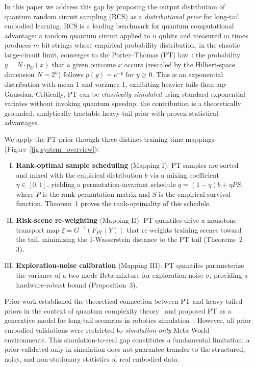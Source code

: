 \documentclass[10pt]{article}
\begin{document}
In this paper we address this gap by proposing the output distribution of quantum random
circuit sampling (RCS) as a \emph{distributional prior} for long-tail embodied learning.
RCS is a leading benchmark for quantum computational advantage: a random quantum circuit
applied to $n$ qubits and measured $m$ times produces $m$ bit strings whose empirical
probability distribution, in the chaotic large-circuit limit, converges to the
Porter--Thomas (PT) law~\citep{porter1956statistical,fischer1982randomness}:
the probability $y=N\cdot p_U(x)$ that a given outcome $x$ occurs (rescaled by the
Hilbert-space dimension $N=2^n$) follows $p(y)=e^{-y}$ for $y\ge 0$.
This is an exponential distribution with mean 1 and variance 1, exhibiting heavier tails
than any Gaussian.  Critically, PT can be \emph{classically simulated} using standard
exponential variates without invoking quantum speedup; the contribution is a theoretically
grounded, analytically tractable heavy-tail prior with proven statistical advantages.

We apply the PT prior through three distinct training-time mappings
(Figure~\ref{fig:system_overview}):

\begin{enumerate}[I)]
\item \textbf{Rank-optimal sample scheduling} (Mapping I): PT samples are sorted and
  mixed with the empirical distribution $b$ via a mixing coefficient $\eta\in[0,1]$,
  yielding a permutation-invariant schedule $q=(1-\eta)b+\eta P S$, where $P$ is the
  rank-permutation matrix and $S$ is the empirical survival function.  Theorem~1 proves
  the rank-optimality of this schedule.
\item \textbf{Risk-scene re-weighting} (Mapping II): PT quantiles drive a monotone
  transport map $\xi=G^{-1}(F_{PT}(Y))$ that re-weights training scenes toward the
  tail, minimizing the 1-Wasserstein distance to the PT tail (Theorems~2--3).
\item \textbf{Exploration-noise calibration} (Mapping III): PT quantiles parameterize
  the variance of a two-mode Beta mixture for exploration noise $\sigma$, providing
  a hardware-robust bound (Proposition~3).
\end{enumerate}

Prior work established the theoretical connection between PT and heavy-tailed priors
in the context of quantum complexity theory~\citep{boixo2018characterizing,aaronson2011computational}
and proposed PT as a generative model for long-tail scenarios in robotics
simulation~\citep{zeng2024quantum}.  However, all prior embodied validations were
restricted to \emph{simulation-only} Meta-World environments.  This simulation-to-real
gap constitutes a fundamental limitation: a prior validated only in simulation does not
guarantee transfer to the structured, noisy, and non-stationary statistics of real embodied
data.
\end{document}
